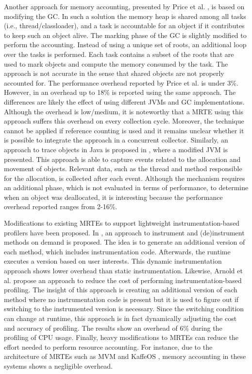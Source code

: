 Another approach for memory accounting, presented by Price et al. \cite{Price:2003:GCM:829515.830545}, is based on modifying the GC.
In such a solution the memory heap is shared among all tasks (i.e., thread/classloader), and a task is accountable for an object if it contributes to keep such an object alive.
The marking phase of the GC is slightly modified to perform the accounting.
Instead of using a unique set of roots, an additional loop over the tasks is performed.
Each task contains a subset of the roots that are used to mark objects and compute the memory consumed by the task.
The approach is not accurate in the sense that shared objects are not properly accounted for.
The performance overhead reported by Price et al. \cite{Price:2003:GCM:829515.830545} is under 3$\%$.
However, in \cite{dsn/09/geoffray/ijvm} an overhead up to 18\% is reported using the same approach.
The differences are likely the effect of using different JVMs and GC implementations.
Although the overhead is low/medium, it is noteworthy that a MRTE using this approach suffers this overhead on every collection cycle.
Moreover, the technique cannot be applied if reference counting is used and it remains unclear whether it is possible to integrate the approach in a concurrent collector.
Similarly, an approach to trace objects in Java is proposed in \cite{Lengauer:2015:AEO:2668930.2688037}, where a modified JVM is presented.
This approach is able to capture events related to the allocation and movement of objects.
Relevant data, such as the thread and method responsible for the allocation, is collected after each event.
Although the mechanism requires an additional phase, which is not evaluated in terms of performance, to determine when an object was deallocated, it is interesting because the performance overhead reported ranges from 2-16\%.

Modifications to existing MRTEs to support lightweight instrumentation-based profilers have been proposed.
In \cite{Dmitriev:2004:PJA:974043.974067}, an approach to instrument and (de)instrument methods on demand is proposed.
The idea is to generate an additional version of each method, which includes instrumentation code.
Afterwards, the runtime executes a version based on user interests.
This dynamic instrumentation approach shows lower overhead than static instrumentation.
Likewise, Arnold et al. \cite{citeulike:481405} propose an approach to reduce the cost of performing instrumentation-based profiling.
The insight of this approach is creating an additional version of each method where no instrumentation code is present but it is used to figure out if switching to the instrumented version is necessary.
Since the switching condition can change at runtime, this approach is in fact dynamically adjusting the cost and accuracy of profiling.
The results show an overhead of 6\% during the profiling of CPU usage.
Finally, heavy modifications to MRTEs can reduce the effort needed to perform resource accounting.
For instance, due to the architecture of MRTEs such as MVM \cite{czajkowski_multitasking_2001} and KaffeOS \cite{back_processes_2000}, memory accounting in these systems shows a negligible overhead.

